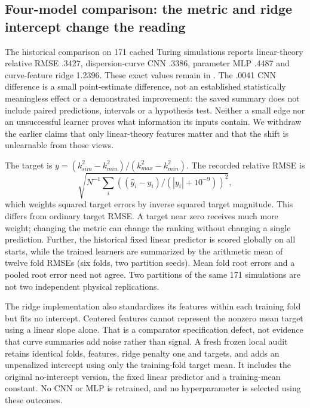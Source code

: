 \subsection{Four-model comparison: the metric and ridge intercept change the reading}
The historical comparison on 171 cached Turing simulations reports linear-theory relative RMSE .3427, dispersion-curve CNN .3386, parameter MLP .4487 and curve-feature ridge 1.2396. These exact values remain in . The .0041 CNN difference is a small point-estimate difference, not an established statistically meaningless effect or a demonstrated improvement: the saved summary does not include paired predictions, intervals or a hypothesis test. Neither a small edge nor an unsuccessful learner proves what information its inputs contain. We withdraw the earlier claims that only linear-theory features matter and that the shift is unlearnable from those views.

The target is $y=(k^2_{sim}-k^2_{min})/(k^2_{max}-k^2_{min})$. The recorded relative RMSE is\[\sqrt{N^{-1}\sum_i ((\hat y_i-y_i)/(|y_i|+10^{-9}))^2},\]\noindent which weights squared target errors by inverse squared target magnitude. This differs from ordinary target RMSE. A target near zero receives much more weight; changing the metric can change the ranking without changing a single prediction. Further, the historical fixed linear predictor is scored globally on all starts, while the trained learners are summarized by the arithmetic mean of twelve fold RMSEs (six folds, two partition seeds). Mean fold root errors and a pooled root error need not agree. Two partitions of the same 171 simulations are not two independent physical replications.

The ridge implementation also standardizes its features within each training fold but fits no intercept. Centered features cannot represent the nonzero mean target using a linear slope alone. That is a comparator specification defect, not evidence that curve summaries add noise rather than signal. A fresh frozen local audit retains identical folds, features, ridge penalty one and targets, and adds an unpenalized intercept using only the training-fold target mean. It includes the original no-intercept version, the fixed linear predictor and a training-mean constant. No CNN or MLP is retrained, and no hyperparameter is selected using these outcomes.


